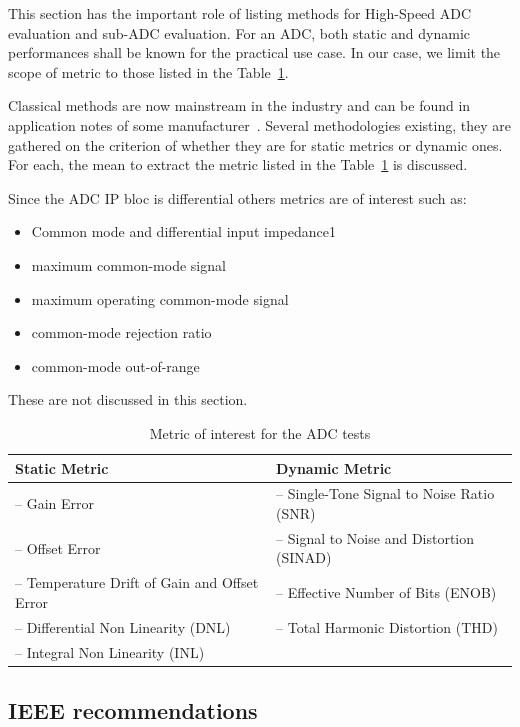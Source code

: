 This section has the important role of listing methods for High-Speed ADC evaluation and sub-ADC evaluation. For an ADC, both static and dynamic performances shall be known for the practical use case. In our case, we limit the scope of metric to those listed in the Table~\ref{tbl:adc-metric-subset}.

Classical methods are now mainstream in the industry and can be found in application notes of some manufacturer~\cite{AD-AN835,TI-SBAA002A,AD-DCH2005}. Several methodologies existing, they are gathered on the criterion of whether they are for static metrics or dynamic ones. For each, the mean to extract the metric listed in the Table~\ref{tbl:adc-metric-subset} is discussed.

Since the ADC IP bloc is differential others metrics are of interest such as:
\begin{itemize}
    \item Common mode and differential input impedance1
    \item maximum common-mode signal
    \item maximum operating common-mode signal
    \item common-mode rejection ratio
    \item common-mode out-of-range
\end{itemize}
These are not discussed in this section.

\begin{table}[htp]
    \centering
    \caption{Metric of interest for the ADC tests}
    \label{tbl:adc-metric-subset}
    \begin{tabular}{l|l}
        \toprule
        \textbf{Static Metric} & \textbf{Dynamic Metric} \\ \midrule
        -- Gain Error & -- Single-Tone Signal to Noise Ratio (SNR)\\
        -- Offset Error & -- Signal to Noise and Distortion (SINAD)\\
        -- Temperature Drift of Gain and Offset Error & -- Effective Number of Bits (ENOB)\\
        -- Differential Non Linearity (DNL) & -- Total Harmonic Distortion (THD) \\
        -- Integral Non Linearity (INL) & \\ \bottomrule
    \end{tabular}
\end{table}

\subsection{IEEE recommendations}
